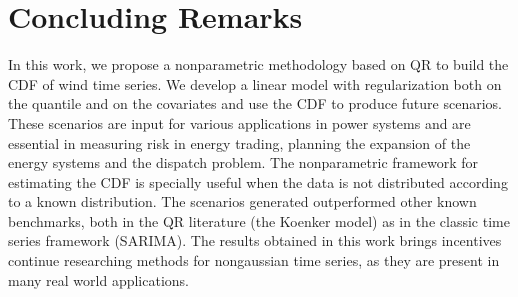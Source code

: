 \section{Concluding Remarks}

In this work, we propose a nonparametric methodology based on QR to build the CDF of wind time series.  We develop a linear model with regularization both on the quantile and on the covariates and use the CDF to produce future scenarios. These scenarios are input for various applications in power systems and are essential in measuring risk in energy trading, planning the expansion of the energy systems and the dispatch problem. The nonparametric framework for estimating the CDF is specially useful when the data is not distributed according to a known distribution. The scenarios generated outperformed other known benchmarks, both in the QR literature (the Koenker model) as in the classic time series framework (SARIMA). The results obtained in this work brings incentives continue researching methods for nongaussian time series, as they are present in many real world applications. 